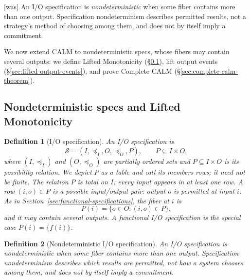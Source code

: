 \documentclass[sigconf]{cidr-2027}
\newtheorem{definition}{Definition}
\theoremstyle{remark}
\newcommand{\InputOrd}{\preceq_I}
\newcommand{\OutputOrd}{\preceq_O}
\newcommand{\commitment}{commitment\xspace}
\newcommand{\Spec}{\mathcal{S}}
\newcommand{\spectype}[1][]{I/O specification#1\xspace}
\newcommand{\Spectype}[1][]{I/O specification#1\xspace}
\newcommand{\fiber}[1]{P(#1)}
\begin{document}
{\footnotesize\color{black!50}\noindent\textsf{[was]} An \spectype is \emph{nondeterministic} when some fiber
contains more than one output.  Specification nondeterminism describes
permitted results, not a strategy's method of choosing among them, and does not
by itself imply a \commitment.\par}

\color{blue!70!black}We now extend CALM to nondeterministic specs, whose fibers may contain several outputs: we define Lifted Monotonicity (\S\ref{sec:relational-specifications}), lift output events (\S\ref{sec:lifted-output-events}), and prove Complete CALM (\S\ref{sec:complete-calm-theorem}).\color{black}

\subsection{Nondeterministic specs and Lifted Monotonicity}
\label{sec:relational-specifications}

\color{blue!70!black}\begin{definition}[\Spectype]
\label{def:relational-specification}
An \emph{\spectype} is
        \begin{equation}
  \Spec=(I,\InputOrd,O,\OutputOrd,P),
  \qquad P\subseteq I\times O,
  \label{eq:relational-specification}
        \end{equation}
  where $(I,\InputOrd)$ and $(O,\OutputOrd)$ are partially ordered sets and
  $P\subseteq I\times O$ is its \emph{possibility relation}.  We depict $P$ as
a table and call its members rows; it need not be finite.  The relation $P$
  is total on $I$: every input appears in at least one row.  A row $(i,o)\in P$
  is a possible input/output pair: output $o$ is permitted at input $i$.  As in
  Section~\ref{sec:functional-specifications}, the fiber at $i$ is
        \begin{equation}
  \fiber{i}=\{o\in O:(i,o)\in P\},
  \label{eq:fiber}
        \end{equation}
  and it may contain several outputs.  A functional \spectype is the special
  case $\fiber{i}=\{f(i)\}$.\color{black}
\end{definition}

\color{blue!70!black}\begin{definition}[Nondeterministic \spectype]
\label{def:nondeterministic}
An \spectype is \emph{nondeterministic} when some fiber
contains more than one output.  Specification nondeterminism describes
which results are permitted, not how a system chooses among them, and does not
by itself imply a \commitment.\color{black}
\end{definition}
\end{document}
